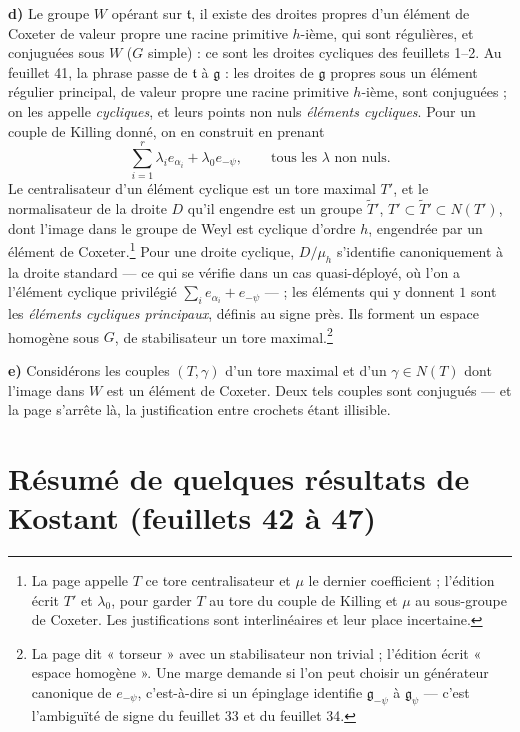 \documentclass[11pt,a4paper]{article}
\begin{document}
\textbf{d)} Le groupe $W$ opérant sur $\mathfrak{t}$, il existe des droites
propres d'un élément de Coxeter de valeur propre une racine primitive $h$-ième,
qui sont régulières, et conjuguées sous $W$ ($G$ simple) : ce sont les droites
cycliques des feuillets 1--2. Au feuillet 41, la phrase passe de $\mathfrak{t}$ à
$\mathfrak{g}$ : les droites de $\mathfrak{g}$ propres sous un élément régulier
principal, de valeur propre une racine primitive $h$-ième, sont conjuguées ; on
les appelle \emph{cycliques}, et leurs points non nuls \emph{éléments
cycliques}. Pour un couple de Killing donné, on en construit en prenant
\[
  \sum_{i=1}^{r}\lambda_{i}e_{\alpha_{i}}+\lambda_{0}e_{-\psi},
  \qquad\text{tous les }\lambda\text{ non nuls}.
\]
Le centralisateur d'un élément cyclique est un tore maximal $T'$, et le
normalisateur de la droite $D$ qu'il engendre est un groupe $\widetilde{T}'$,
$T'\subset\widetilde{T}'\subset N(T')$, dont l'image dans le groupe de Weyl est
cyclique d'ordre $h$, engendrée par un élément de Coxeter.\footnote{La page
appelle $T$ ce tore centralisateur et $\mu$ le dernier coefficient ;
l'édition écrit $T'$ et $\lambda_{0}$, pour garder $T$ au tore du couple de
Killing et $\mu$ au sous-groupe de Coxeter. Les justifications sont
interlinéaires et leur place incertaine.} Pour une droite cyclique, $D/\mu_{h}$
s'identifie canoniquement à la droite standard — ce qui se vérifie dans un cas
quasi-déployé, où l'on a l'élément cyclique privilégié
$\sum_{i}e_{\alpha_{i}}+e_{-\psi}$ — ; les éléments qui y donnent $1$ sont les
\emph{éléments cycliques principaux}, définis au signe près. Ils forment un
espace homogène sous $G$, de stabilisateur un tore maximal.\footnote{La page
dit « torseur » avec un stabilisateur non trivial ; l'édition écrit « espace
homogène ». Une marge demande si l'on peut choisir un générateur canonique de
$e_{-\psi}$, c'est-à-dire si un épinglage identifie $\mathfrak{g}_{-\psi}$ à
$\mathfrak{g}_{\psi}$ — c'est l'ambiguïté de signe du feuillet 33 et du
feuillet 34.}

\textbf{e)} Considérons les couples $(T,\gamma)$ d'un tore maximal et d'un
$\gamma\in N(T)$ dont l'image dans $W$ est un élément de Coxeter. Deux tels
couples sont conjugués — et la page s'arrête là, la justification entre
crochets étant illisible.

\section*{Résumé de quelques résultats de Kostant (feuillets 42 à 47)}
\end{document}
